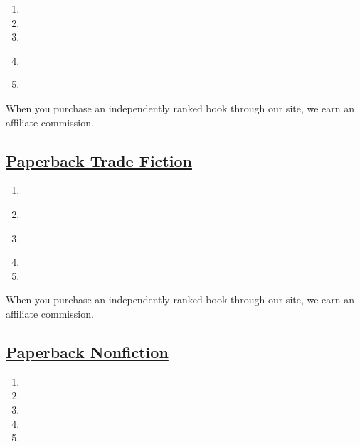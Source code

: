 \begin{enumerate}
\def\labelenumi{\arabic{enumi}.}
\tightlist
\item
\item
\item
\item
  \href{https://www.nytimes3xbfgragh.onion/2019/08/20/books/review/how-to-be-an-antiracist-ibram-x-kendi.html}{}
\item
\end{enumerate}

When you purchase an independently ranked book through our site, we earn
an affiliate commission.

\hypertarget{paperback-trade-fiction}{%
\subsection{\texorpdfstring{\href{/books/best-sellers/trade-fiction-paperback/}{Paperback
Trade
Fiction}}{Paperback Trade Fiction}}\label{paperback-trade-fiction}}

\begin{enumerate}
\def\labelenumi{\arabic{enumi}.}
\tightlist
\item
\item
  \href{https://www.nytimes3xbfgragh.onion/2017/09/25/books/review/little-fires-everywhere-celeste-ng.html}{}
\item
  \href{https://www.nytimes3xbfgragh.onion/2019/07/11/books/review-nickel-boys-colson-whitehead.html}{}
\item
\item
\end{enumerate}

When you purchase an independently ranked book through our site, we earn
an affiliate commission.

\hypertarget{paperback-nonfiction}{%
\subsection{\texorpdfstring{\href{/books/best-sellers/paperback-nonfiction/}{Paperback
Nonfiction}}{Paperback Nonfiction}}\label{paperback-nonfiction}}

\begin{enumerate}
\def\labelenumi{\arabic{enumi}.}
\tightlist
\item
\item
\item
\item
\item
\end{enumerate}

